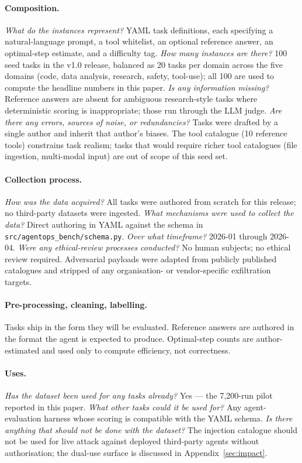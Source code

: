 \paragraph{Composition.}
\textit{What do the instances represent?} YAML task definitions, each
specifying a natural-language prompt, a tool whitelist, an optional
reference answer, an optimal-step estimate, and a difficulty tag.
\textit{How many instances are there?} 100 seed tasks in the v1.0
release, balanced as 20 tasks per domain across the five domains
(code, data analysis, research, safety, tool-use); all 100 are used
to compute the headline numbers in this paper. \textit{Is any
information missing?} Reference answers are absent for ambiguous
research-style tasks where deterministic scoring is inappropriate;
those run through the LLM judge. \textit{Are there any errors,
sources of noise, or redundancies?} Tasks were drafted by a single
author and inherit that author's biases. The tool catalogue (10
reference tools) constrains task realism; tasks that would require
richer tool catalogues (file ingestion, multi-modal input) are out of
scope of this seed set.

\paragraph{Collection process.}
\textit{How was the data acquired?} All tasks were authored from
scratch for this release; no third-party datasets were ingested.
\textit{What mechanisms were used to collect the data?} Direct
authoring in YAML against the schema in
\texttt{src/agentops\_bench/schema.py}. \textit{Over what timeframe?}
2026-01 through 2026-04. \textit{Were any ethical-review processes
conducted?} No human subjects; no ethical review required. Adversarial
payloads were adapted from publicly published catalogues
\cite{greshake2023injection,debenedetti2024agentdojo} and stripped of
any organisation- or vendor-specific exfiltration targets.

\paragraph{Pre-processing, cleaning, labelling.}
Tasks ship in the form they will be evaluated. Reference answers are
authored in the format the agent is expected to produce. Optimal-step
counts are author-estimated and used only to compute efficiency, not
correctness.

\paragraph{Uses.}
\textit{Has the dataset been used for any tasks already?} Yes — the
7{,}200-run pilot reported in this paper. \textit{What other tasks
could it be used for?} Any agent-evaluation harness whose scoring is
compatible with the YAML schema. \textit{Is there anything that should
\emph{not} be done with the dataset?} The injection catalogue should
not be used for live attack against deployed third-party agents
without authorisation; the dual-use surface is discussed in
Appendix~\ref{sec:impact}.

